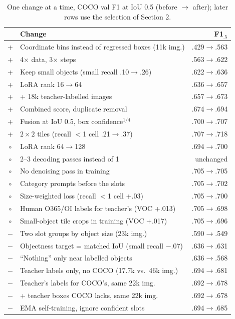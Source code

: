 \documentclass[10pt,twocolumn]{article}
\newcommand{\ok}{\textcolor{green!45!black}{+}}
\newcommand{\no}{\textcolor{red!70!black}{$-$}}
\newcommand{\eq}{$\circ$}
\begin{document}
\begin{table}[t]
\centering\small\setlength{\tabcolsep}{3pt}
\caption{One change at a time, COCO val F1 at IoU 0.5 (before $\rightarrow$ after); later rows use the selection of Section 2.}
\label{tab:ablate}
\begin{tabular}{@{}clr@{}}
\toprule
& Change & F1$_{.5}$ \\
\midrule
\ok & Coordinate bins instead of regressed boxes (11k img.) & .429$\rightarrow$.563 \\
\ok & 4$\times$ data, 3$\times$ steps & .563$\rightarrow$.622 \\
\ok & Keep small objects (small recall .10$\rightarrow$.26) & .622$\rightarrow$.636 \\
\ok & LoRA rank 16$\rightarrow$64 & .636$\rightarrow$.657 \\
\ok & + 18k teacher-labelled images & .657$\rightarrow$.673 \\
\ok & Combined score, duplicate removal & .674$\rightarrow$.694 \\
\ok & Fusion at IoU 0.5, box confidence$^{1/4}$ & .700$\rightarrow$.707 \\
\ok & $2\times2$ tiles (recall $<$1 cell .21$\rightarrow$.37) & .707$\rightarrow$.718 \\
\eq & LoRA rank 64$\rightarrow$128 & .694$\rightarrow$.700 \\
\eq & 2--3 decoding passes instead of 1 & unchanged \\
\eq & No denoising pass in training & .705$\rightarrow$.705 \\
\eq & Category prompts before the slots & .705$\rightarrow$.702 \\
\eq & Size-weighted loss (recall $<$1 cell +.03) & .705$\rightarrow$.700 \\
\eq & Human O365/OI labels for teacher's (VOC +.013) & .705$\rightarrow$.698 \\
\eq & Small-object tile crops in training (VOC +.017) & .705$\rightarrow$.696 \\
\no & Two slot groups by object size (23k img.) & .590$\rightarrow$.549 \\
\no & Objectness target = matched IoU (small recall $-$.07) & .636$\rightarrow$.631 \\
\no & ``Nothing'' only near labelled objects & .636$\rightarrow$.568 \\
\no & Teacher labels only, no COCO (17.7k vs.\ 46k img.) & .694$\rightarrow$.681 \\
\no & Teacher's labels for COCO's, same 22k img. & .692$\rightarrow$.678 \\
\no & + teacher boxes COCO lacks, same 22k img. & .692$\rightarrow$.678 \\
\no & EMA self-training, ignore confident slots & .694$\rightarrow$.685 \\
\bottomrule
\end{tabular}
\end{table}
\end{document}
